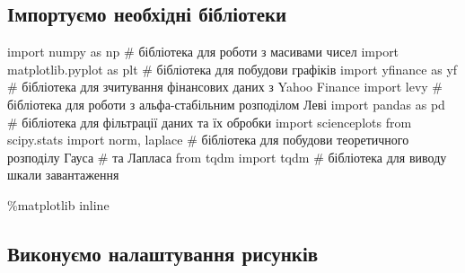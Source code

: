 \documentclass[
  letterpaper,
]{report}
\newenvironment{Shaded}{\begin{snugshade}}{\end{snugshade}}
\newcommand{\CommentTok}[1]{\textcolor[rgb]{0.37,0.37,0.37}{#1}}
\newcommand{\ImportTok}[1]{\textcolor[rgb]{0.00,0.46,0.62}{#1}}
\newcommand{\NormalTok}[1]{\textcolor[rgb]{0.00,0.23,0.31}{#1}}
\newcommand{\OperatorTok}[1]{\textcolor[rgb]{0.37,0.37,0.37}{#1}}
\begin{document}
\hypertarget{ux456ux43cux43fux43eux440ux442ux443ux454ux43cux43e-ux43dux435ux43eux431ux445ux456ux434ux43dux456-ux431ux456ux431ux43bux456ux43eux442ux435ux43aux438}{%
\subsection{Імпортуємо необхідні
бібліотеки}\label{ux456ux43cux43fux43eux440ux442ux443ux454ux43cux43e-ux43dux435ux43eux431ux445ux456ux434ux43dux456-ux431ux456ux431ux43bux456ux43eux442ux435ux43aux438}}

\begin{Shaded}
\begin{Highlighting}[]
\ImportTok{import}\NormalTok{ numpy }\ImportTok{as}\NormalTok{ np                 }\CommentTok{\# бібліотека для роботи з масивами чисел}
\ImportTok{import}\NormalTok{ matplotlib.pyplot }\ImportTok{as}\NormalTok{ plt    }\CommentTok{\# бібліотека для побудови графіків}
\ImportTok{import}\NormalTok{ yfinance }\ImportTok{as}\NormalTok{ yf              }\CommentTok{\# бібліотека для зчитування фінансових даних з Yahoo Finance}
\ImportTok{import}\NormalTok{ levy                        }\CommentTok{\# бібліотека для роботи з альфа{-}стабільним розподілом Леві}
\ImportTok{import}\NormalTok{ pandas }\ImportTok{as}\NormalTok{ pd                }\CommentTok{\# бібліотека для фільтрації даних та їх обробки}
\ImportTok{import}\NormalTok{ scienceplots}
\ImportTok{from}\NormalTok{ scipy.stats }\ImportTok{import}\NormalTok{ norm, laplace  }\CommentTok{\# бібліотека для побудови теоретичного розподілу Гауса}
                                       \CommentTok{\# та Лапласа}
\ImportTok{from}\NormalTok{ tqdm }\ImportTok{import}\NormalTok{ tqdm                  }\CommentTok{\# бібліотека для виводу шкали завантаження}

\OperatorTok{\%}\NormalTok{matplotlib inline}
\end{Highlighting}
\end{Shaded}

\hypertarget{ux432ux438ux43aux43eux43dux443ux454ux43cux43e-ux43dux430ux43bux430ux448ux442ux443ux432ux430ux43dux43dux44f-ux440ux438ux441ux443ux43dux43aux456ux432}{%
\subsection{Виконуємо налаштування
рисунків}\label{ux432ux438ux43aux43eux43dux443ux454ux43cux43e-ux43dux430ux43bux430ux448ux442ux443ux432ux430ux43dux43dux44f-ux440ux438ux441ux443ux43dux43aux456ux432}}
\end{document}
